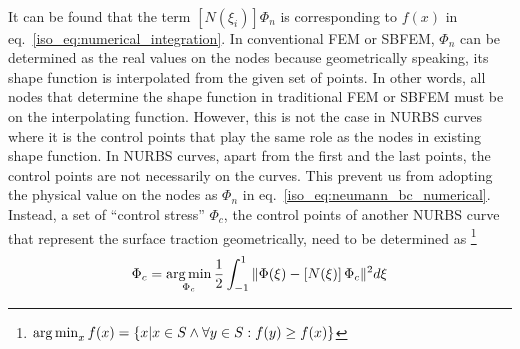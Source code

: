 \paragraph{}
It can be found that the term $[N(\xi_i)] \Phi_n$ is corresponding to $f(x)$ in eq.~\ref{iso_eq:numerical_integration}.
In conventional FEM or SBFEM, $\Phi_n$ can be determined as the real values on the nodes because geometrically speaking,
    its shape function is interpolated from the given set of points.
In other words, all nodes that determine the shape function in traditional FEM or SBFEM must be on the interpolating function.
However, this is not the case in NURBS curves where it is the control points that play the same role as the nodes in existing
    shape function.
In NURBS curves, apart from the first and the last points, the control points are not necessarily on the curves.
This prevent us from adopting the physical value on the nodes as $\Phi_n$ in eq.~\ref{iso_eq:neumann_bc_numerical}.
Instead, a set of ``control stress'' $\Phi_c$, the control points of another NURBS curve that represent the surface traction
    geometrically, need to be determined as \footnote{$\operatorname*{arg\,min}_x f(x) = \left\{
        x | x \in S \wedge \forall y \in S : f(y) \geq f(x)
    \right\}$}
    \begin{equation}
        \Phi_c = \operatorname*{arg\,min}_{\Phi_c}
            \frac{1}{2}
            \int_{-1}^1
            \|
                \Phi(\xi)-
                    \left[ N(\xi) \right]
                    \Phi_c
            \|^2
            d\xi            
    \label{iso_eq:surface_traction_fitting}
    \end{equation}

